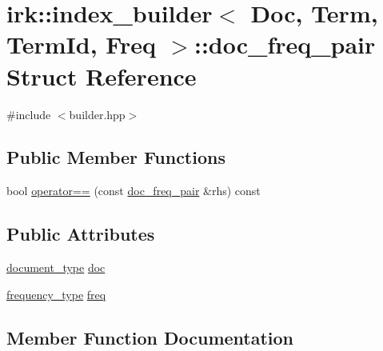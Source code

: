 \hypertarget{structirk_1_1index__builder_1_1doc__freq__pair}{}\section{irk\+:\+:index\+\_\+builder$<$ Doc, Term, Term\+Id, Freq $>$\+:\+:doc\+\_\+freq\+\_\+pair Struct Reference}
\label{structirk_1_1index__builder_1_1doc__freq__pair}


{\ttfamily \#include $<$builder.\+hpp$>$}

\subsection*{Public Member Functions}
\begin{DoxyCompactItemize}
\item 
bool \mbox{\hyperlink{structirk_1_1index__builder_1_1doc__freq__pair_a27a19f40285130c8d60b75312e85f8f3}{operator==}} (const \mbox{\hyperlink{structirk_1_1index__builder_1_1doc__freq__pair}{doc\+\_\+freq\+\_\+pair}} \&rhs) const
\end{DoxyCompactItemize}
\subsection*{Public Attributes}
\begin{DoxyCompactItemize}
\item 
\mbox{\hyperlink{classirk_1_1index__builder_a4230ae91e9f84c95ee99b3607c6e952e}{document\+\_\+type}} \mbox{\hyperlink{structirk_1_1index__builder_1_1doc__freq__pair_aa7a0c86b1212dbbe06389ce45ff18d4b}{doc}}
\item 
\mbox{\hyperlink{classirk_1_1index__builder_af2efa68fc3f10fd9cb000d16279bfbb1}{frequency\+\_\+type}} \mbox{\hyperlink{structirk_1_1index__builder_1_1doc__freq__pair_ae71d3afc16b2a295ef6338886639dff7}{freq}}
\end{DoxyCompactItemize}


\subsection{Member Function Documentation}
\mbox{\label{structirk_1_1index__builder_1_1doc__freq__pair_a27a19f40285130c8d60b75312e85f8f3}} 
